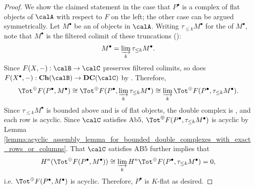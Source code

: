 \begin{proof}
    We show the claimed statement in the case that $P^\bullet$ is a complex of flat objects of $\calA$ with respect to $F$ on the left; the other case can be argued symmetrically. Let $M^\bullet$ be an  of objects in $\calA$. Writing $\tau_{\leq k} M^\bullet$ for the  of $M^\bullet$, note that $M^\bullet$ is the filtered colimit of these truncations ():
    $$M^\bullet = \varinjlim_k \tau_{\leq k} M^\bullet.$$
    Since $F(X,-): \calB \to \calC$ preserves filtered colimits, so does $F(X^\bullet, -): \mathbf{Ch}(\calB) \to \mathbf{DC}(\calC)$ by . Therefore,
    $$\Tot^{\oplus} F(P^\bullet, M^\bullet) \cong \Tot^{\oplus} F(P^\bullet, \varinjlim_k \tau_{\leq k} M^\bullet) \cong \varinjlim_{k} \Tot^{\oplus} F(P^\bullet, \tau_{\leq k} M^\bullet).$$
    Since $\tau_{\leq k} M^\bullet$ is bounded above and is of flat objects, the double complex  is , and each row is acyclic. Since $\calC$ satisfies Ab$5$, $\Tot^{\oplus} F(P^\bullet, \tau_{\leq k} M^\bullet)$ is acyclic by Lemma \ref{lemma:acyclic_assembly_lemma_for_bounded_double_complexes_with_exact_rows_or_columns}. That $\calC$ satisfies AB$5$ further implies that 
    $$H^n(\Tot^{\oplus}  F(P^\bullet, M^\bullet)) \cong \varinjlim_{k} H^n \Tot^{\oplus} F(P^\bullet, \tau_{\leq k} M^\bullet) = 0,$$
    i.e. $\Tot^{\oplus}  F(P^\bullet, M^\bullet)$ is acyclic. Therefore, $P^\bullet$ is $K$-flat as desired. 
\end{proof}
